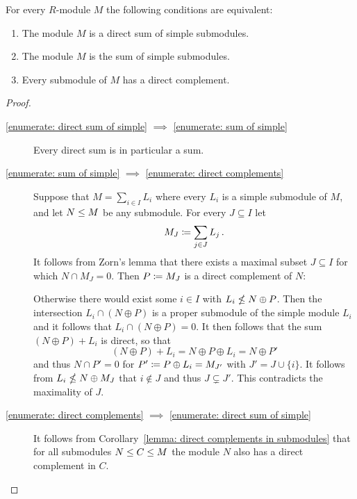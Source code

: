 \begin{proposition}
  \label{proposition: characterisation semisimple modules}
  For every $R$-module $M$ the following conditions are equivalent:
  \begin{enumerate}
    \item
      \label{enumerate: direct sum of simple}
      The module $M$ is a direct sum of simple submodules. 
    \item
      \label{enumerate: sum of simple}
      The module $M$ is the sum of simple submodules.
    \item
      \label{enumerate: direct complements}
      Every submodule of $M$ has a direct complement.
  \end{enumerate}
\end{proposition}


\begin{proof}
  \leavevmode
  \begin{description}
    \item[\ref*{enumerate: direct sum of simple} $\implies$ \ref*{enumerate: sum of simple}]
      Every direct sum is in particular a sum.
    \item[\ref*{enumerate: sum of simple} $\implies$ \ref*{enumerate: direct complements}]
      Suppose that $M = \sum_{i \in I} L_i$ where every $L_i$ is a simple submodule of $M$, and let $N \leq M$ be any submodule.
      For every $J \subseteq I$ let
      \[
                  M_J
        \coloneqq  \sum_{j \in J} L_j \,.
      \]
      It follows from Zorn’s lemma that there exists a maximal subset $J \subseteq I$ for which $N \cap M_J = 0$.
      Then $P \coloneqq M_J$ is a direct complement of $N$:
      
      Otherwise there would exist some $i \in I$ with $L_i \nleq N \oplus P$.
      Then the intersection $L_i \cap (N \oplus P)$ is a proper submodule of the simple module $L_i$ and it follows that $L_i \cap (N \oplus P) = 0$.
      It then follows that the sum $(N \oplus P) + L_i$ is direct, so that
      \[
          (N \oplus P) + L_i
        = N \oplus P \oplus L_i
        = N \oplus P'
      \]
      and thus $N \cap P' = 0$ for $P' \coloneqq P \oplus L_i = M_{J'}$ with $J' = J \cup \{i\}$.
      It follows from $L_i \nleq N \oplus M_J$ that $i \notin J$ and thus $J \subsetneq J'$.
      This contradicts the maximality of $J$.
    \item[\ref*{enumerate: direct complements} $\implies$ \ref*{enumerate: direct sum of simple}]
      It follows from Corollary~\ref{lemma: direct complements in submodules} that for all submodules $N \leq C \leq M$ the module $N$ also has a direct complement in $C$.
      

\end{description}
\end{proof}
